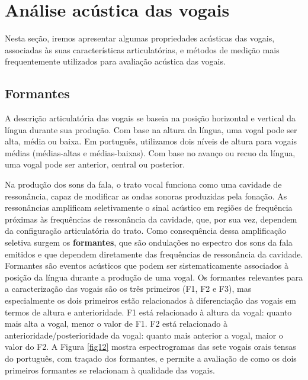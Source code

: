 \documentclass[portuguese]{textolivre}
\begin{document}
\section{Análise acústica das vogais}\label{sec-vogais}
Nesta seção, iremos apresentar algumas propriedades acústicas das vogais, associadas às suas características articulatórias, e métodos de medição mais frequentemente utilizados para avaliação acústica das vogais.

\subsection{Formantes}\label{sec-formantes}

A descrição articulatória das vogais se baseia na posição horizontal e vertical da língua durante sua produção. Com base na altura da língua, uma vogal pode ser alta, média ou baixa. Em português, utilizamos dois níveis de altura para vogais médias (médias-altas e médias-baixas). Com base no avanço ou recuo da língua, uma vogal pode ser anterior, central ou posterior. 

Na produção dos sons da fala, o trato vocal funciona como uma cavidade de ressonância, capaz de modificar as ondas sonoras produzidas pela fonação. As ressonâncias amplificam seletivamente o sinal acústico em regiões de frequência próximas às frequências de ressonância da cavidade, que, por sua vez, dependem da configuração articulatória do trato. Como consequência dessa amplificação seletiva surgem os \textbf{formantes}, que são ondulações no espectro dos sons da fala emitidos e que dependem diretamente das frequências de ressonância da cavidade. Formantes são eventos acústicos que podem ser sistematicamente associados à posição da língua durante a produção de uma vogal. Os formantes relevantes para a caracterização das vogais são os três primeiros (F1, F2 e F3), mas especialmente os dois primeiros estão relacionados à diferenciação das vogais em termos de altura e anterioridade. F1 está relacionado à altura da vogal: quanto mais alta a vogal, menor o valor de F1. F2 está relacionado à anterioridade/posterioridade da vogal: quanto mais anterior a vogal, maior o valor do F2. A Figura \ref{fig12} mostra espectrogramas das sete vogais orais tensas do português, com traçado dos formantes, e permite a avaliação de como os dois primeiros formantes se relacionam à qualidade das vogais.
\end{document}
